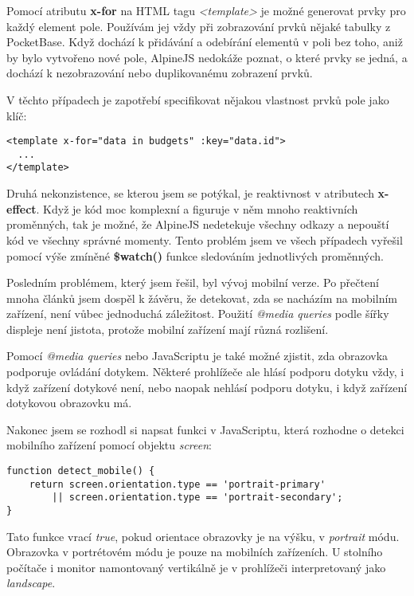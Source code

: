 \documentclass[11pt,a4paper,twoside,openright]{report}
\begin{document}
Pomocí atributu \textbf{x-for} na HTML tagu \emph{<template>} je možné generovat prvky pro každý element
pole. Používám jej vždy při zobrazování prvků nějaké tabulky z PocketBase. Když dochází k přidávání a odebírání
elementů v poli bez toho, aniž by bylo vytvořeno nové pole, AlpineJS nedokáže poznat, o které prvky se jedná,
a dochází k nezobrazování nebo duplikovanému zobrazení prvků.

V těchto případech je zapotřebí specifikovat nějakou vlastnost prvků pole jako klíč:

\begin{verbatim}
<template x-for="data in budgets" :key="data.id">
  ...
</template>
\end{verbatim}

Druhá nekonzistence, se kterou jsem se potýkal, je reaktivnost v atributech \textbf{x-effect}. Když je kód
moc komplexní a figuruje v něm mnoho reaktivních proměnných, tak je možné, že AlpineJS nedetekuje všechny
odkazy a nepouští kód ve všechny správné momenty. Tento problém jsem ve všech případech vyřešil pomocí
výše zmíněné \textbf{\$watch()} funkce sledováním jednotlivých proměnných.

Posledním problémem, který jsem řešil, byl vývoj mobilní verze. Po přečtení mnoha článků jsem dospěl
k žávěru, že detekovat, zda se nacházím na mobilním zařízení, není vůbec jednoduchá záležitost. Použití
\emph{@media queries} podle šířky displeje není jistota, protože mobilní zařízení mají různá rozlišení.

Pomocí \emph{@media queries} nebo JavaScriptu je také možné zjistit, zda obrazovka podporuje
ovládání dotykem. Některé prohlížeče ale hlásí podporu dotyku vždy, i když zařízení dotykové
není, nebo naopak nehlásí podporu dotyku, i když zařízení dotykovou obrazovku má.

Nakonec jsem se rozhodl si napsat funkci v JavaScriptu, která rozhodne o detekci mobilního zařízení
pomocí objektu \emph{screen}:

\begin{verbatim}
function detect_mobile() {
    return screen.orientation.type == 'portrait-primary'
        || screen.orientation.type == 'portrait-secondary';
}
\end{verbatim}

Tato funkce vrací \emph{true}, pokud orientace obrazovky je na výšku, v \emph{portrait} módu. Obrazovka
v portrétovém módu je pouze na mobilních zařízeních. U stolního počítače i monitor namontovaný vertikálně
je v prohlížeči interpretovaný jako \emph{landscape}.
\end{document}
